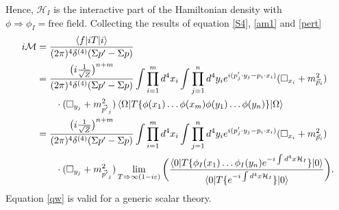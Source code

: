 Hence, $\mathcal{H}_I$ is the interactive part of the Hamiltonian density with $\phi\Rightarrow \phi_I=\text{free field}$. Collecting the results of equation \eqref{S4}, \eqref{am1} and \eqref{pert}
\begin{equation}
	\begin{split}
		i\mathcal{M}&=\frac{\braket{f|iT|i}}{(2\pi)^4\delta^{(4)}(\Sigma p'-\Sigma p)}\\
		&=\frac{\big(i\frac{1}{\sqrt{Z}}\big)^{n+m}}{(2\pi)^4\delta^{(4)}(\Sigma p'-\Sigma p)}\int\prod_{i=1}^m d^4x_i\int\prod_{j=1}^n d^4y_ie^{i(p'_j\cdot y_j-p_i\cdot x_i)}(\square _{x_i}+m_{\vec{p}_i}^2)\\
		&\qquad \cdot(\square _{y_j}+m_{\vec{p'}_j}^2)\braket{\Omega|T\{\phi(x_1)\dots\phi(x_m)\phi(y_1)\dots \phi(y_n)\}|\Omega}\\
		&=\frac{\big(i\frac{1}{\sqrt{Z}}\big)^{n+m}}{(2\pi)^4\delta^{(4)}(\Sigma p'-\Sigma p)}\int\prod_{i=1}^m d^4x_i\int\prod_{j=1}^n d^4y_ie^{i(p'_j\cdot y_j-p_i\cdot x_i)}(\square _{x_i}+m_{\vec{p}_i}^2)\\
		&\qquad\cdot (\square _{y_j}+m_{\vec{p'}_j}^2)\lim\limits_{T\Rightarrow \infty (1-i\varepsilon)}\bigg(\frac{\braket{0|T\{\phi_I(x_1)\dots\phi_I(y_n)e^{-i\int d^4x \mathcal{H}_I}\}|0}}{\braket{0|T\{e^{-i\int d^4x \mathcal{H}_I}\}|0}}\bigg). 
	\end{split}
	\label{qw}
\end{equation} 
Equation \eqref{qw} is valid for a generic scalar theory.

